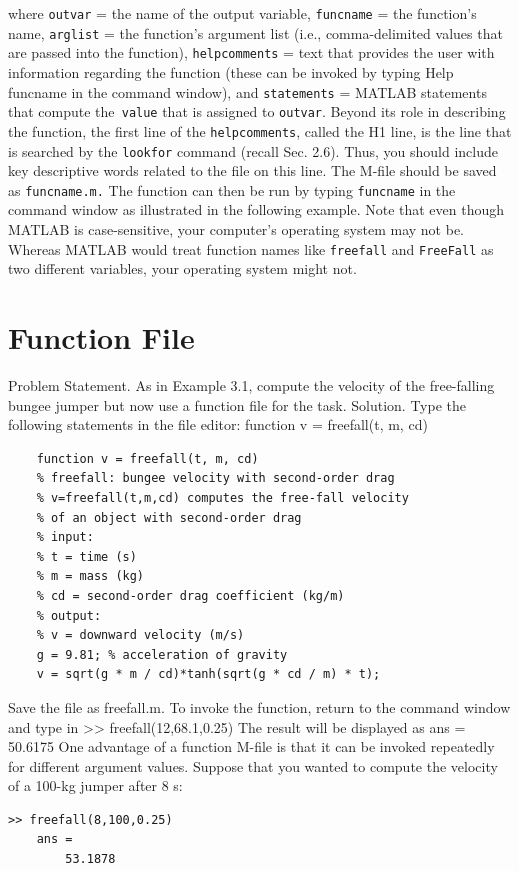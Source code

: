\documentclass[../main.tex]{subfiles}
\begin{document}
where \texttt{outvar} = the name of the output variable, \texttt{funcname} = the function's name,
\texttt{arglist} = the function's argument list (i.e., comma-delimited values that are passed into
the function), \texttt{helpcomments} = text that provides the user with information regarding the
function (these can be invoked by typing {Help funcname} in the command window), and
\texttt{statements} = MATLAB statements that compute the\texttt{ value} that is assigned to \texttt{outvar}.
Beyond its role in describing the function, the first line of the \texttt{helpcomments}, called
the H1 line, is the line that is searched by the \texttt{lookfor} command (recall Sec. 2.6). Thus,
you should include key descriptive words related to the file on this line.
The M-file should be saved as \texttt{funcname.m.} The function can then be run by typing
\texttt{funcname} in the command window as illustrated in the following example. Note that even
though MATLAB is case-sensitive, your computer's operating system may not be.
Whereas MATLAB would treat function names like \texttt{freefall} and \texttt{FreeFall} as two different variables, your operating system might not.


\section*{Function File}


Problem Statement. As in Example 3.1, compute the velocity of the free-falling bungee
jumper but now use a function file for the task.
Solution. Type the following statements in the file editor:
function v = freefall(t, m, cd)
\begin{lstlisting}
    function v = freefall(t, m, cd)
    % freefall: bungee velocity with second-order drag
    % v=freefall(t,m,cd) computes the free-fall velocity
    % of an object with second-order drag
    % input:
    % t = time (s)
    % m = mass (kg)
    % cd = second-order drag coefficient (kg/m)
    % output:
    % v = downward velocity (m/s)
    g = 9.81; % acceleration of gravity
    v = sqrt(g * m / cd)*tanh(sqrt(g * cd / m) * t);

\end{lstlisting}

Save the file as freefall.m. To invoke the function, return to the command window and
type in
>> freefall(12,68.1,0.25)
The result will be displayed as
ans =
50.6175
One advantage of a function M-file is that it can be invoked repeatedly for different
argument values. Suppose that you wanted to compute the velocity of a 100-kg jumper
after 8 s:
\begin{lstlisting}[frame=none, numbers=none]
    >> freefall(8,100,0.25)
    ans =
        53.1878
\end{lstlisting}
\end{document}
